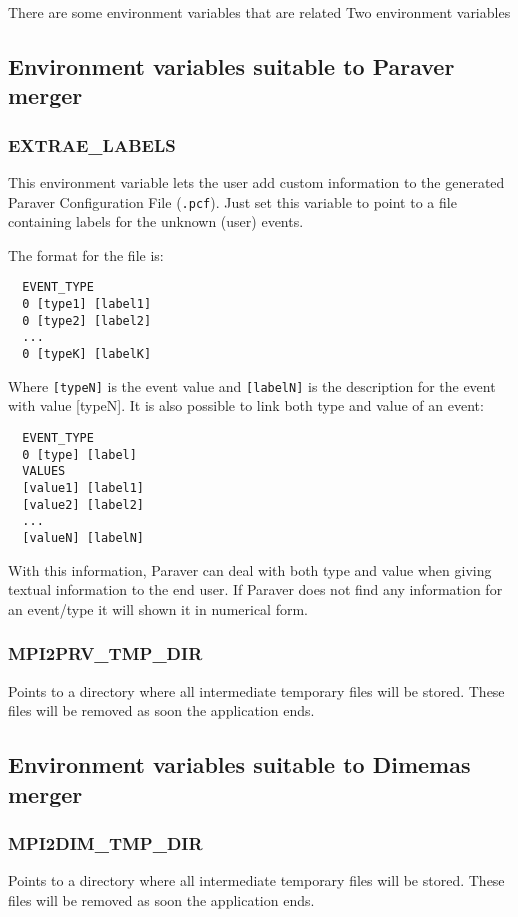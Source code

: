 There are some environment variables that are related Two environment variables 

\subsection{Environment variables suitable to Paraver merger}

\subsubsection{EXTRAE\_LABELS}

This environment variable lets the user add custom information to the generated Paraver Configuration File ({\tt .pcf}). Just set this variable to point to a file containing labels for the unknown (user) events.

The format for the file is:

\begin{verbatim}
  EVENT_TYPE
  0 [type1] [label1]
  0 [type2] [label2]
  ...
  0 [typeK] [labelK]
\end{verbatim}

Where {\tt [typeN]} is the event value and {\tt [labelN]} is the description for the event with value [typeN].
It is also possible to link both type and value of an event:

\begin{verbatim}
  EVENT_TYPE
  0 [type] [label]
  VALUES
  [value1] [label1]
  [value2] [label2]
  ...
  [valueN] [labelN]
\end{verbatim}

With this information, Paraver can deal with both type and  value when giving textual information to the end user. If Paraver does not find any information for an event/type it will shown it in numerical form.

\subsubsection{MPI2PRV\_TMP\_DIR}

Points to a directory where all intermediate temporary files will be stored. These files will be removed as soon the application ends.

\subsection{Environment variables suitable to Dimemas merger}

\subsubsection{MPI2DIM\_TMP\_DIR}

Points to a directory where all intermediate temporary files will be stored. These files will be removed as soon the application ends.

